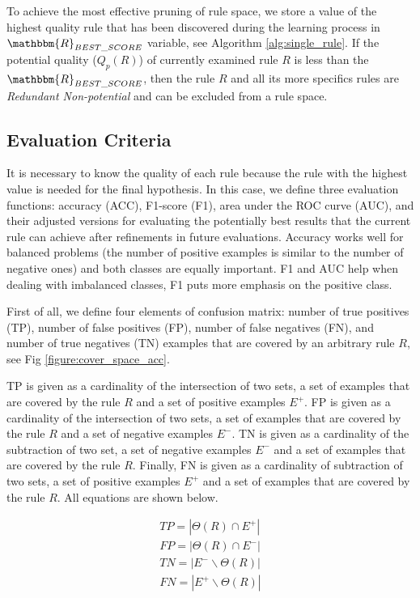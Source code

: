 \documentclass{bmcart}
\begin{document}
To achieve the most effective pruning of rule space, we store a value of the highest quality rule that has been discovered during the learning process in $\mathbbm{R}_{BEST\_SCORE}$ variable, see Algorithm \ref{alg:single_rule}. If the potential quality ($Q_p(R)$) of currently examined rule $R$ is less than the $\mathbbm{R}_{BEST\_SCORE}$, then the rule $R$ and all its more specifics rules are \emph{Redundant Non-potential} and can be excluded from a rule space. 

\subsection*{Evaluation Criteria} \label{sec:eval}
It is necessary to know the quality of each rule because the rule with the highest value is needed for the final hypothesis. In this case, we define three evaluation functions: accuracy (ACC), F1-score (F1), area under the ROC curve (AUC), and their adjusted versions for evaluating the potentially best results that the current rule can achieve after refinements in future evaluations. Accuracy works well for balanced problems (the number of positive examples is similar to the number of negative ones) and both classes are equally important. F1 and AUC help when dealing with imbalanced classes, F1 puts more emphasis on the positive class.

First of all, we define four elements of confusion matrix: number of true positives (TP), number of false positives (FP), number of false negatives (FN), and number of true negatives (TN) examples that are covered by an arbitrary rule $R$, see Fig \ref{figure:cover_space_acc}.



TP is given as a cardinality of the intersection of two sets, a set of examples that are covered by the rule $R$ and a set of positive examples $E^{+}$. FP is given as a cardinality of the intersection of two sets, a set of examples that are covered by the rule $R$ and a set of negative examples $E^{-}$. TN is given as a cardinality of the subtraction of two set, a set of negative examples $E^{-}$ and a set of examples that are covered by the rule $R$. Finally, FN is given as a cardinality of subtraction of two sets, a set of positive examples $E^{+}$ and a set of examples that are covered by the rule $R$. All equations are shown below.

\begin{eqnarray}
\label{eq:tpfptnfn}
TP = |\Theta(R) \cap E^{+}| \\ 
FP = |\Theta(R) \cap E^{-}| \\
TN = |E^{-} \backslash \Theta(R)| \\
FN = |E^{+} \backslash \Theta(R)|
\end{eqnarray}
\end{document}
